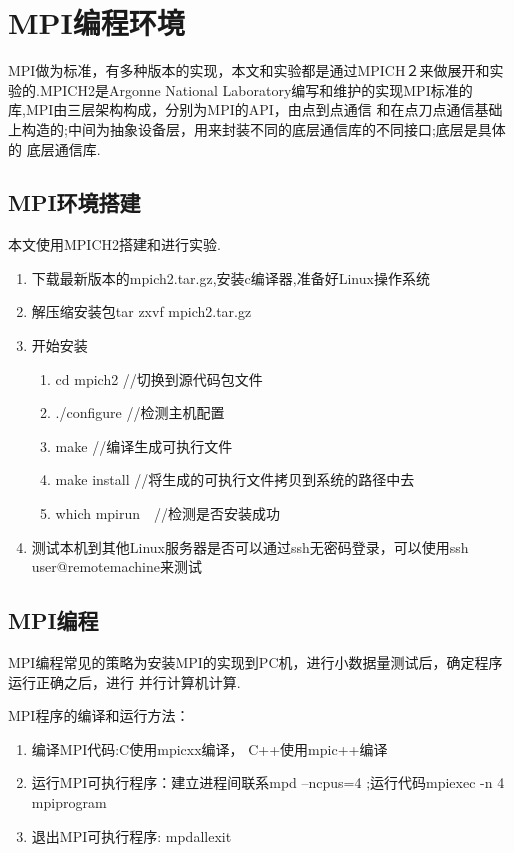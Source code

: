 \section{MPI编程环境}
    MPI做为标准，有多种版本的实现，本文和实验都是通过MPICH２来做展开和实验的.MPICH2是Argonne National Laboratory编写和维护的实现MPI标准的库,MPI由三层架构构成，分别为MPI的API，由点到点通信
和在点刀点通信基础上构造的;中间为抽象设备层，用来封装不同的底层通信库的不同接口;底层是具体的
底层通信库.
\subsection{MPI环境搭建}
    
    本文使用MPICH2搭建和进行实验.

    \begin{enumerate}
    \item 下载最新版本的mpich2.tar.gz,安装c编译器,准备好Linux操作系统
    \item 解压缩安装包tar zxvf mpich2.tar.gz 
    \item 开始安装
            \begin{enumerate}
            \item cd mpich2  //切换到源代码包文件
            \item ./configure //检测主机配置
            \item make        //编译生成可执行文件
            \item make install //将生成的可执行文件拷贝到系统的路径中去
            \item which mpirun　//检测是否安装成功
            \end{enumerate}
    \item 测试本机到其他Linux服务器是否可以通过ssh无密码登录，可以使用ssh user@remotemachine来测试
    \end{enumerate}

\subsection{MPI编程}
    MPI编程常见的策略为安装MPI的实现到PC机，进行小数据量测试后，确定程序运行正确之后，进行
并行计算机计算.

    MPI程序的编译和运行方法：
    \begin{enumerate}
    \item 编译MPI代码:C使用mpicxx编译， C++使用mpic++编译
    \item 运行MPI可执行程序：建立进程间联系mpd --ncpus=4 ;运行代码mpiexec -n 4 mpiprogram
    \item 退出MPI可执行程序: mpdallexit
    \end{enumerate}
